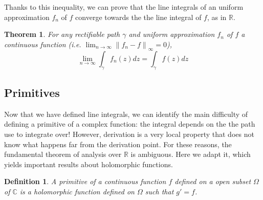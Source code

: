 \documentclass{article}
\newtheorem*{defi}{Definition}
\newtheorem*{thm*}{Theorem}
\begin{document}
Thanks to this inequality, we can prove that the line integrals of an uniform approximation $f_n$ of $f$ converge towards the the line integral of $f$, as in $\mathbb{R}$.

\begin{thm*}
    For any rectifiable path $\gamma$ and uniform approximation $f_n$ of $f$ a continuous function (i.e. $\lim_{n\rightarrow \infty}\left\| f_n -f \right \|_{\infty} = 0$), 
    $$ \lim_{n\rightarrow\infty} \int_\gamma f_n(z)dz = \int_\gamma f(z)dz $$
\end{thm*}

\subsection{Primitives}

Now that we have defined line integrals, we can identify the main difficulty of defining a primitive of a complex function: the integral depends on the the path use to integrate over! However, derivation is a very local property that does not know what happens far from the derivation point. For these reasons, the fundamental theorem of analysis over $\mathbb{R}$ is ambiguous. Here we adapt it, which yields important results about holomorphic functions.

\begin{defi}
    A primitive of a continuous function $f$ defined on a open subset $\Omega$ of $\mathbb{C}$ is a holomorphic function defined on $\Omega$ such that $g'=f$.
\end{defi}
\end{document}
